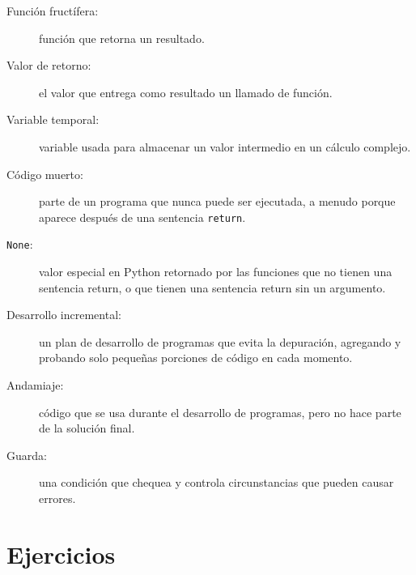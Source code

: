\begin{description}

\item[Función fructífera:] función que retorna un resultado.

\item[Valor de retorno:]  el valor que entrega como resultado un llamado de
función.

\item[Variable temporal:]  variable usada para almacenar un 
valor intermedio en un cálculo complejo.

\item[Código muerto:]  parte de un programa que nunca puede ser ejecutada, 
a menudo porque aparece después de una sentencia  \texttt{return}.

\item[\texttt{None}:]  valor especial en Python retornado por las funciones
que no tienen una sentencia return, o que tienen una sentencia return
sin un argumento.

\item[Desarrollo incremental:]  un plan de desarrollo de programas 
que evita la depuración, agregando y probando solo pequeñas
porciones de código en cada momento.

\item[Andamiaje:]  código que se usa durante el desarrollo de programas, pero
no hace parte de la solución final.

\item[Guarda:]  una condición que chequea y controla circunstancias que
pueden causar errores.


\end{description}

\section{Ejercicios}

